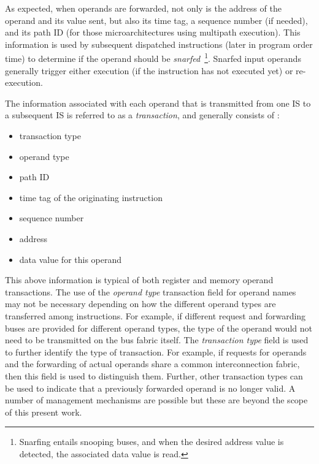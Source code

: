 \documentclass[10pt,dvips]{article}
\begin{document}
As expected, when operands are forwarded, not only is the 
address of the operand
and its value sent, but also its time tag, a sequence number (if needed),
and its path ID 
(for
those microarchitectures using multipath execution).
This information is used by subsequent 
dispatched instructions 
(later in program order time)
to determine if
the operand should be {\em snarfed}~\footnote{Snarfing entails snooping
buses, and when the desired address value is detected, 
the associated data value is read.}.
Snarfed input operands generally trigger either execution
(if the instruction has not executed yet)
or re-execution.

The information associated with each operand that is
transmitted from one IS to a subsequent IS
is referred
to as a {\em transaction}, and generally consists of :
%
\begin{itemize}
\vspace{-0.10in}
\item{transaction type}
\vspace{-0.10in}
\item{operand type}
\vspace{-0.10in}
\item{path ID}
\vspace{-0.10in}
\item{time tag of the originating instruction}
\vspace{-0.10in}
\item{sequence number}
\vspace{-0.10in}
\item{address}
\vspace{-0.10in}
\item{data value for this operand}
\vspace{-0.10in}
\end{itemize}   
%
This above information is typical of both
register and memory operand transactions.
The use of the \textit{operand type} transaction field 
for operand names may not be
necessary depending on how the different operand types
are transferred among instructions.
For example, if different request and forwarding buses are
provided for different operand types, the type of the operand
would not need to be transmitted on the bus fabric itself.
The \textit{transaction type} field is used to further
identify the type of transaction.  
For example, if requests for operands and the forwarding of
actual operands share a common interconnection fabric, then
this field is used to distinguish them.
Further, other transaction types can be used to indicate that
a previously forwarded operand is no longer valid.
A number of management mechanisms are possible but
these are beyond the scope of this present work.
\end{document}
